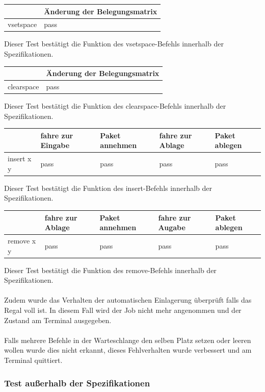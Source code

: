 \begin{tabular}{|l|l|}
\hline
         	& Änderung der Belegungsmatrix\\
\hline
vsetspace & pass\\
\hline
\end{tabular}

Dieser Test bestätigt die Funktion des vsetspace-Befehls innerhalb der Spezifikationen.

\begin{tabular}{|l|l|}
\hline
         	& Änderung der Belegungsmatrix\\
\hline
clearspace & pass\\
\hline
\end{tabular}

Dieser Test bestätigt die Funktion des clearspace-Befehls innerhalb der Spezifikationen.


\begin{tabular}{|l|l|l|l|l|}
\hline
         	&  fahre zur Eingabe & Paket annehmen   & fahre zur Ablage & Paket ablegen\\
\hline
insert x y & pass & pass & pass & pass\\
\hline
\end{tabular}

Dieser Test bestätigt die Funktion des insert-Befehls innerhalb der Spezifikationen.

\begin{tabular}{|l|l|l|l|l|}
\hline
         	&  fahre zur Ablage & Paket annehmen   & fahre zur Augabe & Paket ablegen\\
\hline
remove x y & pass & pass & pass & pass\\
\hline
\end{tabular}

Dieser Test bestätigt die Funktion des remove-Befehls innerhalb der Spezifikationen.\\
\\
Zudem wurde das Verhalten der automatischen Einlagerung überprüft falls das Regal voll ist. In diesem Fall wird der Job nicht mehr angenommen und der Zustand am Terminal ausgegeben.\\
\\
Falls mehrere Befehle in der Warteschlange den selben Platz setzen oder leeren wollen wurde dies nicht erkannt, dieses Fehlverhalten wurde verbessert  und am Terminal quittiert.


\subsubsection {Test außerhalb der Spezifikationen}

